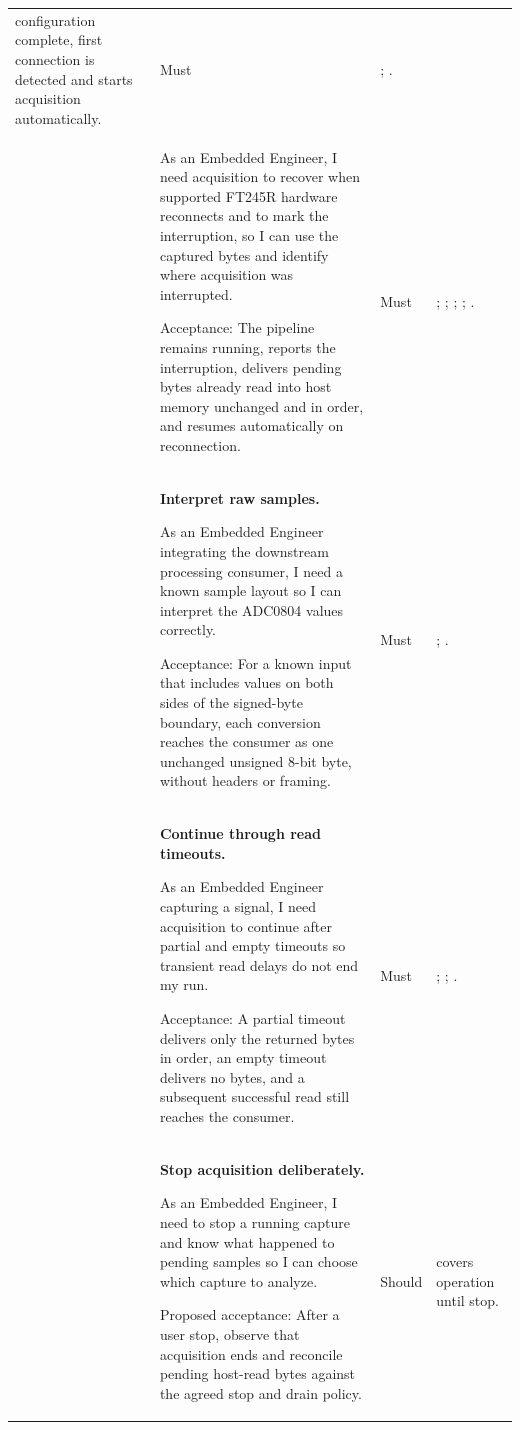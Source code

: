 \begin{tabularx}{\linewidth}{L{1.9cm}YL{1.8cm}L{3.4cm}}
configuration complete, first connection is detected and starts acquisition
automatically.
& Must
& ; .\\
& As an Embedded Engineer, I need acquisition to recover when supported
FT245R hardware reconnects and to mark the interruption, so I can use the
captured bytes and identify where acquisition was interrupted.
\par Acceptance: The pipeline remains running, reports the interruption,
delivers pending bytes already read into host memory unchanged and in
order, and resumes automatically on reconnection.
& Must
& ; ;
; ;
.\\
\addlinespace
{}
& \textbf{Interpret raw samples.}\par
As an Embedded Engineer integrating the downstream processing consumer,
I need a known sample layout so I can interpret the ADC0804 values correctly.
\par Acceptance: For a known input that includes values on both sides
of the signed-byte boundary, each conversion reaches the consumer as one
unchanged unsigned 8-bit byte, without headers or framing.
& Must
& ; .\\
\addlinespace
{}
& \textbf{Continue through read timeouts.}\par
As an Embedded Engineer capturing a signal, I need acquisition to continue
after partial and empty timeouts so transient read delays do not end my run.
\par Acceptance: A partial timeout delivers only the returned bytes in order,
an empty timeout delivers no bytes, and a subsequent successful read still
reaches the consumer.
& Must
& ; ;
.\\
\addlinespace
{}
& \textbf{Stop acquisition deliberately.}\par
As an Embedded Engineer, I need to stop a running capture and know what
happened to pending samples so I can choose which capture to analyze.
\par Proposed acceptance: After a user stop, observe that acquisition ends
and reconcile pending host-read bytes against the agreed stop and drain policy.
& Should
&  covers operation until stop.

\end{tabularx}
